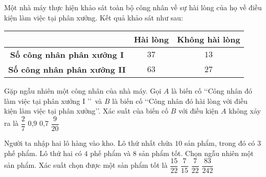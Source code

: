 \begin{ex}%
	Một nhà máy thực hiện khảo sát toàn bộ công nhân về sự hài lòng của họ về điều kiện làm việc tại phân xưởng. Kết quả khảo sát như sau:
	\begin{center}
	\begin{tabular}{|c|c|c|}
	\hline
	\diagbox {Khảo sát công nhân}{Kết quả khảo sát}	& Hài lòng & Không hài lòng \\
	\hline
	\textbf{Số công nhân phân xưởng I}	& $37$ & $13$ \\
	\hline
	\textbf{Số công nhân phân xưởng II}	& $63$ & $27$\\
	\hline
	\end{tabular}
	\end{center}
	Gặp ngẫu nhiên một công nhân của nhà máy. Gọi $A$ là biến cố \lq\lq  Công nhân đó làm việc tại phân xưởng I \rq\rq \, và $B$ là biến cố \lq\lq  Công nhân đó hài lòng với điều kiện làm việc tại phân xưởng\rq\rq.
	Xác suất của biến cố $B$ với điều kiện $A$ không xảy ra là
	\choice
	{$\dfrac{2}{7}$}
	{$0\text{,}9$}
	{\True$0\text{,}7$}
	{$\dfrac{9}{20}$}
\end{ex}

\begin{ex}
	Người ta nhập hai lô hàng vào kho. Lô thứ nhất chứa $10$ sản phẩm, trong đó có $3$ phế phẩm. Lô thứ hai có $4$ phế phẩm và $8$ sản phẩm tốt. Chọn ngẫu nhiên một sản phẩm. Xác suất chọn được một sản phẩm tốt là
	\choice
	{\True $\dfrac{15}{22}$}
	{$\dfrac{7}{15}$}
	{$\dfrac{7}{22}$}
	{$\dfrac{83}{242}$}
\end{ex}


